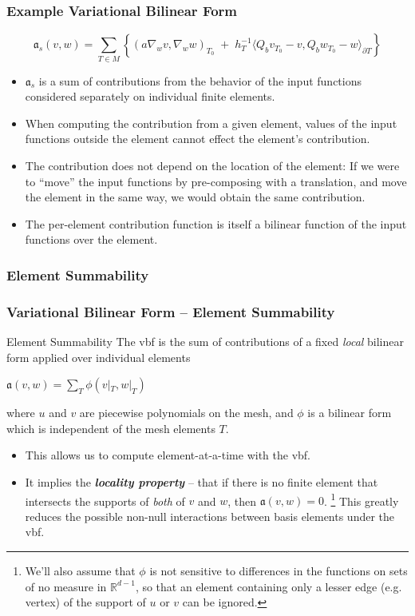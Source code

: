 \documentclass[compress]{beamer}
\begin{document}
\begin{frame}
  \frametitle{Example Variational Bilinear Form}
  $$\mathfrak a_s(v,w) = \sum_{T \in M} \left\{ (a \nabla_w v,\nabla_w w)_{\scriptscriptstyle T_0} \;+\;
    h_T^{-1}\langle Q_b v_{\scriptscriptstyle T_0} - v,Q_b w_{\scriptscriptstyle T_0} - w \rangle_{\partial T} \right\}$$
  \pause
  \begin{itemize}[<+->]
    \item $\mathfrak a_s$ is a sum of contributions from the behavior of the input functions considered
      separately on individual finite elements.
    \item When computing the contribution from a given element, values of the input functions outside the element cannot effect the
      element's contribution.
    \item The contribution does not depend on the location of the element:  If we were to ``move'' the input functions by
      pre-composing with a translation, and move the element in the same way, we would obtain the same contribution.
    \item The per-element contribution function is itself a bilinear function of the input functions over the element.
  \end{itemize}
\end{frame}

\subsubsection{Element Summability}

\begin{frame}
  \frametitle{Variational Bilinear Form -- Element Summability}
  \begin{block}{Element Summability}
    The vbf is the sum of contributions of a fixed \emph{local} bilinear form applied over individual elements
    \begin{center}$\mathfrak{a}(v,w) = \sum_T { \phi(v|_T,w|_T) }$\end{center}
      where $u$ and $v$ are piecewise polynomials on the mesh, and $\phi$ is a bilinear form which is independent of the mesh elements $T$.
  \end{block}
  \pause
  \begin{itemize}[<+->]
    \item This allows us to compute element-at-a-time with the vbf.
    \item It implies the \emph{\textbf{locality property}} -- that if there is no finite element that intersects the supports of \emph{both}
      of $v$ and $w$, then $\mathfrak{a}(v,w) = 0$.
        \footnote{We'll also assume that $\phi$ is not sensitive to differences in the functions on sets of no measure in $\mathbb{R}^{d-1}$,
                  so that an element containing only a lesser edge (e.g. vertex) of the support of $u$ or $v$ can be ignored.}
      This greatly reduces the possible non-null interactions between basis elements under the vbf.
  \end{itemize}
\end{frame}
\end{document}
